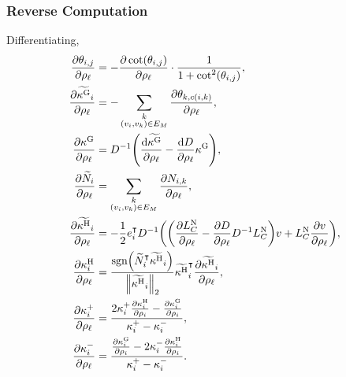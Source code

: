 \subsubsection{Reverse Computation}
Differentiating, \begin{align*}
	\frac{\partial\theta_{i, j}}{\partial\rho_\ell} &= -\frac{\partial\cot\pof{\theta_{i, j}}}{\partial \rho_\ell} \cdot \frac{1}{1 + \cot^2\pof{\theta_{i, j}}}, \\
	\frac{\partial\widetilde{\kappa^\text{G}}_i}{\partial\rho_\ell} &= -\sum_{\substack{k \\ \pof{v_i, v_k} \in E_M}} \frac{\partial\theta_{k, c\pof{i, k}}}{\partial\rho_\ell}, \\
	\frac{\partial\kappa^\text{G}}{\partial\rho_\ell} &= D^{-1}\pof{\frac{\dif\widetilde{\kappa^\text{G}}}{\partial\rho_\ell} - \frac{\dif D}{\partial\rho_\ell}\kappa^\text{G}}, \\
	\frac{\partial\widetilde{N}_i}{\partial\rho_\ell} &= \sum_{\substack{k \\ \pof{v_i, v_k} \in E_M}} \frac{\partial N_{i, k}}{\partial\rho_\ell}, \\
	\frac{\partial\widetilde{\kappa^\text{H}}_i}{\partial\rho_\ell} &= -\frac{1}{2}e_i^\intercal D^{-1}\pof{\pof{\frac{\partial L_C^{\text{N}}}{\partial\rho_\ell} - \frac{\partial D}{\partial\rho_\ell}D^{-1}L_C^{\text{N}}}v + L_C^{\text{N}}\frac{\partial v}{\partial\rho_\ell}}, \\
	\frac{\partial\kappa_i^\text{H}}{\partial\rho_\ell} &= \frac{\sgn\pof{\widetilde{N}_i^\intercal\widetilde{\kappa^\text{H}}_i}}{\norm{\widetilde{\kappa^\text{H}}_i}_2}\widetilde{\kappa^\text{H}}_i^\intercal\frac{\partial\widetilde{\kappa^\text{H}}_i}{\partial\rho_\ell}, \\
	\frac{\partial\kappa^+_i}{\partial\rho_\ell} &= \frac{2\kappa^+_i\frac{\partial\kappa^{\text{H}}_i}{\partial\rho_i} - \frac{\partial\kappa^{\text{G}}_i}{\partial\rho_i}}{\kappa^+_i - \kappa^-_i}, \\
	\frac{\partial\kappa^-_i}{\partial\rho_\ell} &= \frac{\frac{\partial\kappa^{\text{G}}_i}{\partial\rho_i} - 2\kappa^-_i\frac{\partial\kappa^{\text{H}}_i}{\partial\rho_i}}{\kappa^+_i - \kappa^-_i}.
\end{align*}
